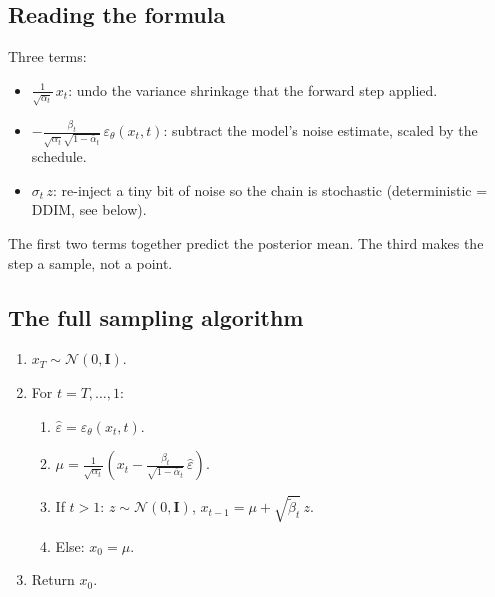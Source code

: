 \documentclass[11pt,a4paper]{article}
\newcommand{\N}{\mathcal{N}}
\newcommand{\eps}{\varepsilon}
\begin{document}
\subsection{Reading the formula}

Three terms:
\begin{itemize}[leftmargin=*]
\item $\frac{1}{\sqrt{\alpha_t}}\,x_t$: undo the variance shrinkage that
  the forward step applied.
\item $-\frac{\beta_t}{\sqrt{\alpha_t}\sqrt{1-\bar{\alpha}_t}}\,\eps_\theta(x_t, t)$:
  subtract the model's noise estimate, scaled by the schedule.
\item $\sigma_t\, z$: re-inject a tiny bit of noise so the chain is stochastic
  (deterministic = DDIM, see below).
\end{itemize}

The first two terms together predict the posterior mean. The third makes
the step a sample, not a point.

\subsection{The full sampling algorithm}

\begin{tcolorbox}[colback=gray!5,colframe=black,title=\textbf{DDPM ancestral sampling}]
\begin{enumerate}[leftmargin=*]
\item $x_T \sim \N(0, \mathbf{I})$.
\item For $t = T, \ldots, 1$:
  \begin{enumerate}[leftmargin=*]
  \item $\hat\eps = \eps_\theta(x_t, t)$.
  \item $\mu = \frac{1}{\sqrt{\alpha_t}}(x_t - \frac{\beta_t}{\sqrt{1-\bar{\alpha}_t}}\,\hat\eps)$.
  \item If $t > 1$: $z \sim \N(0, \mathbf{I})$, $x_{t-1} = \mu + \sqrt{\tilde\beta_t}\, z$.
  \item Else: $x_0 = \mu$.
  \end{enumerate}
\item Return $x_0$.
\end{enumerate}
\end{tcolorbox}
\end{document}
